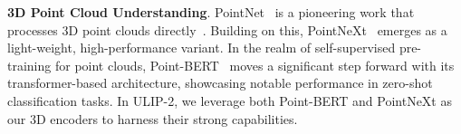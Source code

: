 \documentclass[10pt,twocolumn,letterpaper]{article}
\newcommand{\ning}[1]{\textcolor{blue}{Ning: #1}}
\begin{document}
\vspace{-2mm}
\noindent\textbf{3D Point Cloud Understanding}.
PointNet~\citep{qi2017pointnet} is a pioneering work that processes 3D point clouds directly~\citep{qi2017pointnet++}. Building on this, PointNeXt~\citep{qian2022pointnext} emerges as a light-weight, high-performance variant. In the realm of self-supervised pre-training for point clouds, Point-BERT~\citep{yu2022point} moves a significant step forward with its transformer-based architecture, showcasing notable performance in zero-shot classification tasks. In ULIP-2, we leverage both Point-BERT and PointNeXt as our 3D encoders to harness their strong capabilities.




\end{document}
